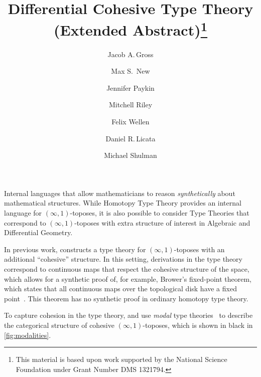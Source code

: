 \documentclass{article}
\title{Differential Cohesive Type Theory (Extended Abstract)\thanks{This
    material is based upon work supported by the National Science Foundation
    under Grant Number DMS 1321794.}}
\author{Jacob A.\,Gross}
\affil[1]{University of Pittsburgh}
\author[2]{Max S.\, New}
\affil[2]{Northeastern University}
\author[3]{Jennifer Paykin}
\affil[3]{University of Pennsylvania}
\author[4]{Mitchell Riley}
\affil[4]{Wesleyan University}
\author[5]{Felix Wellen}
\affil[5]{Karlsruhe Institute of Technology}
\author[4]{Daniel R.\,Licata}
\author[6]{Michael Shulman}
\affil[6]{University of San Diego}
\date{}
\begin{document}
\maketitle


Internal languages  
 that allow mathematicians to reason
\emph{synthetically} about mathematical structures. While Homotopy Type Theory
provides an internal language for $(\infty,1)$-toposes, it is also possible to
consider Type Theories that correspond to $(\infty,1)$-toposes with extra structure
of interest in Algebraic and Differential Geometry. 

In previous work,
\citet{Shulman2015} constructs a type theory for
$(\infty,1)$-toposes with an additional ``cohesive'' structure.
In this setting, derivations in the type theory correspond
to continuous maps that respect the cohesive structure of the space, which
allows for a synthetic proof of, for example, Brower's fixed-point theorem,
which states that all continuous maps over the topological disk have a fixed
point~\citep{Shulman2015}. 
This theorem has no synthetic proof in ordinary homotopy type theory.

To capture cohesion in the type theory, \citep{Shulman2015} and
\citep{Licata2016} use \emph{modal} type theories~
to describe the categorical structure of cohesive $(\infty,1)$-toposes, which is
shown in black in \cref{fig:modalities}. 
\end{document}
